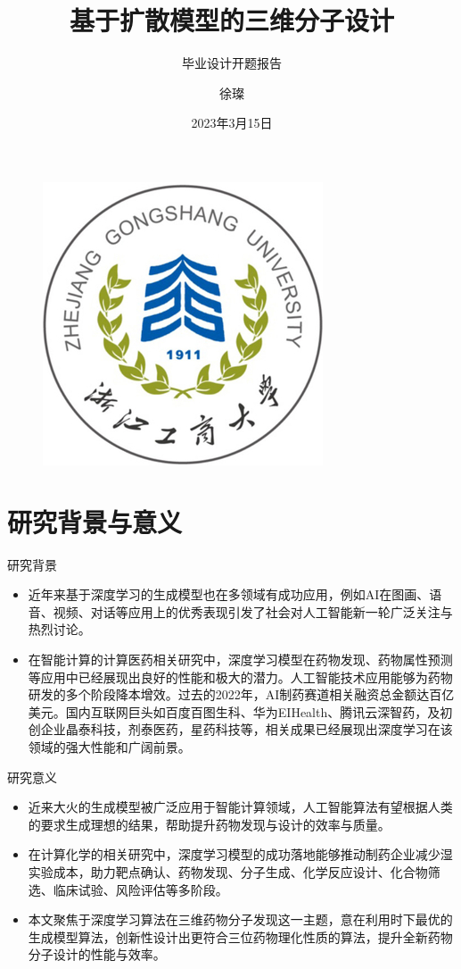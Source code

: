 \documentclass{beamer}
\author{徐璨}
\title{基于扩散模型的三维分子设计}
\subtitle{毕业设计开题报告}
\institute{浙江工商大学 统计与数学学院}
\date{2023年3月15日}
\begin{document}
\kaishu
\begin{frame}
    \titlepage
    \begin{figure}[htpb]
        \begin{center}
            \includegraphics[width=0.15\linewidth]{figure/zjgsu} %
        \end{center}
    \end{figure}
\end{frame}

\begin{frame}
    \tableofcontents[sectionstyle=show,subsectionstyle=show/shaded/hide,subsubsectionstyle=show/shaded/hide]
\end{frame}


\section{研究背景与意义}
\begin{frame}{研究背景}
    \begin{itemize}
        \item 近年来基于深度学习的生成模型也在多领域有成功应用，例如AI在图画、语音、视频、对话等应用上的优秀表现引发了社会对人工智能新一轮广泛关注与热烈讨论。
        \item 在智能计算的计算医药相关研究中，深度学习模型在药物发现、药物属性预测等应用中已经展现出良好的性能和极大的潜力。人工智能技术应用能够为药物研发的多个阶段降本增效。过去的2022年，AI制药赛道相关融资总金额达百亿美元。国内互联网巨头如百度百图生科、华为EIHealth、腾讯云深智药，及初创企业晶泰科技，剂泰医药，星药科技等，相关成果已经展现出深度学习在该领域的强大性能和广阔前景。
    \end{itemize}
\end{frame}

\begin{frame}{研究意义}
    \begin{itemize}
        \item 近来大火的生成模型被广泛应用于智能计算领域，人工智能算法有望根据人类的要求生成理想的结果，帮助提升药物发现与设计的效率与质量。
        \item 在计算化学的相关研究中，深度学习模型的成功落地能够推动制药企业减少湿实验成本，助力靶点确认、药物发现、分子生成、化学反应设计、化合物筛选、临床试验、风险评估等多阶段。
        \item 本文聚焦于深度学习算法在三维药物分子发现这一主题，意在利用时下最优的生成模型算法，创新性设计出更符合三位药物理化性质的算法，提升全新药物分子设计的性能与效率。
    \end{itemize}
\end{frame}
\end{document}
